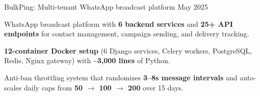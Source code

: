 \resumeProject
  {BulkPing: Multi-tenant WhatsApp broadcast platform}
  {}
  {May 2025}
  {}
  \resumeItemListStart
    \item {WhatsApp broadcast platform with \textbf{6 backend services} and \textbf{25+ API endpoints} for contact management, campaign sending, and delivery tracking.}
    \item {\textbf{12-container Docker setup} (6 Django services, Celery workers, PostgreSQL, Redis, Nginx gateway) with \textbf{\textasciitilde 3,000 lines} of Python.}
    \item {Anti-ban throttling system that randomizes \textbf{3--8s message intervals} and auto-scales daily caps from \textbf{50 $\rightarrow$ 100 $\rightarrow$ 200} over 15 days.}
  \resumeItemListEnd
